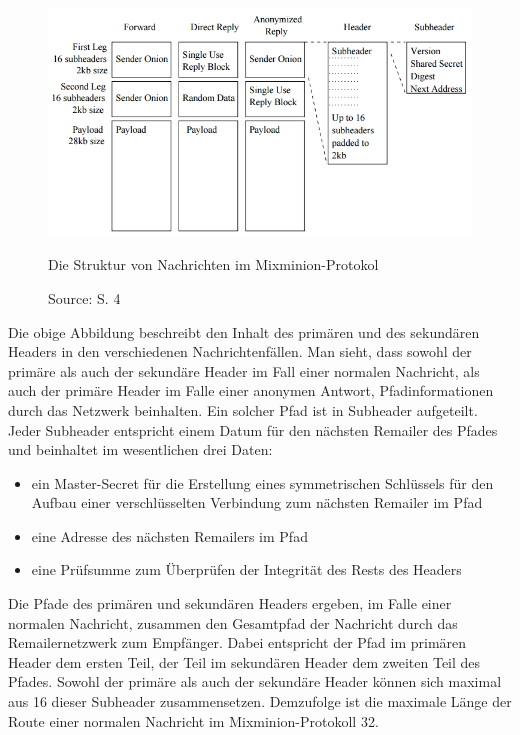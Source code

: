 \begin{figure}
	\begin{center}
		\def\svgwidth{0.9 \linewidth}
		\includegraphics[width = 0.9 \linewidth]{bilder/mixminion_structure.png}
		\caption{Die Struktur von Nachrichten im Mixminion-Protokol}
		\caption*{\hfill Source: S. 4 \cite{mixminion}}
	\end{center}
\end{figure}

Die obige Abbildung beschreibt den Inhalt des primären und des sekundären Headers in den verschiedenen Nachrichtenfällen.
Man sieht, dass sowohl der primäre als auch der sekundäre Header im Fall einer normalen Nachricht, als auch der primäre Header im Falle einer anonymen Antwort, Pfadinformationen durch das Netzwerk beinhalten.
Ein solcher Pfad ist in Subheader aufgeteilt. Jeder Subheader entspricht einem Datum für den nächsten Remailer des Pfades und beinhaltet im wesentlichen drei Daten:
\begin{itemize}
\item ein Master-Secret für die Erstellung eines symmetrischen Schlüssels für den Aufbau einer verschlüsselten Verbindung zum nächsten Remailer im Pfad
\item eine Adresse des nächsten Remailers im Pfad
\item eine Prüfsumme zum Überprüfen der Integrität des Rests des Headers
\end{itemize}
Die Pfade des primären und sekundären Headers ergeben, im Falle einer normalen Nachricht, zusammen den Gesamtpfad der Nachricht durch das Remailernetzwerk zum Empfänger. Dabei entspricht der Pfad im primären Header dem ersten Teil, der Teil im sekundären Header dem zweiten Teil des Pfades.
Sowohl der primäre als auch der sekundäre Header können sich maximal aus 16 dieser Subheader zusammensetzen. Demzufolge ist die maximale Länge der Route einer normalen Nachricht im Mixminion-Protokoll 32.

